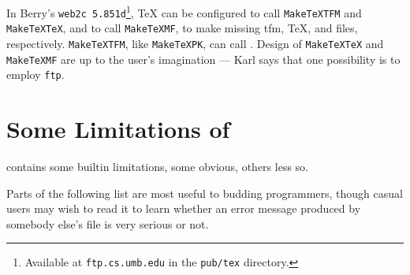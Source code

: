 In {\sc Berry\/}'s {\tt web2c 5.851d}\footnote
{Available at {\tt ftp.cs.umb.edu} in the {\tt pub/tex} directory.},
\TeX{} can be configured to call {\tt MakeTeXTFM} and
{\tt MakeTeXTeX}, and \MF{} to call {\tt MakeTeXMF},
to make missing {\sc tfm}, \TeX{}, and \MF{} files, respectively.
{\tt MakeTeXTFM}, like {\tt MakeTeXPK}, can call \MF{}.
Design of {\tt MakeTeXTeX} and {\tt MakeTeXMF} are up to the user's
imagination --- Karl says that one possibility is to employ {\tt ftp}.


\section{Some Limitations of \MF{}}\label{sec:limit}

\MF{} contains some builtin limitations, some obvious, others
less so.

Parts of the following list are most useful to budding programmers,
though casual users may wish to read it to learn whether
an error message produced by somebody else's \MF{} file is very
serious or not.

